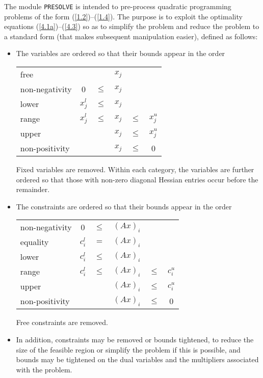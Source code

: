 \documentclass[acmtocl,acmnow]{acmtrans2m}
\newcommand{\req}[1]{(\ref{#1})}
\begin{document}
The module {\tt PRESOLVE} is intended to pre-process
quadratic programming problems of the form \req{1.2}--\req{1.4}.
The purpose is to exploit the
optimality equations \req{4.1a}--\req{4.3} so as to simplify the problem
and reduce the problem to a standard form (that makes subsequent
manipulation easier), defined as follows:
\begin{itemize}
\item The variables are ordered so that their bounds appear in the order
\begin{center}
\begin{tabular}{lccccc}
free                &          &        & $x_j$ &        &          \\
non-negativity      &   0      & $\leq$ & $x_j$ &        &          \\
lower               & $x^l_j$ & $\leq$ & $x_j$ &        &          \\
range               & $x^l_j$ & $\leq$ & $x_j$ & $\leq$ & $x^u_j$ \\
upper               &          &        & $x_j$ & $\leq$ & $x^u_j$ \\
non-positivity      &          &        & $x_j$ & $\leq$ &      0   \\
\end{tabular}
\end{center}

Fixed variables are removed. Within each category, the variables
are further ordered so that those with non-zero diagonal Hessian
entries occur before the remainder.

\item
The constraints are ordered so that their bounds appear in the order
\begin{center}
\begin{tabular}{lccccc}
non-negativity      &     0    & $\leq$ & $( A x)_i$ &        &          \\
equality            & $c^l_i$ &   $=$  & $(A x)_i$ &        &          \\
lower               & $c^l_i$ & $\leq$ & $(A x)_i$ &        &          \\
range               & $c^l_i$ & $\leq$ & $(A x)_i$ & $\leq$ & $c^u_i$ \\
upper               &          &        & $(A x)_i$ & $\leq$ & $c^u_i$ \\
non-positivity      &          &        & $(A x)_i$ & $\leq$ &     0    \\
\end{tabular}
\end{center}
Free constraints are removed.

\item
In addition, constraints may be removed or bounds tightened, to reduce the
size of the feasible region or simplify the problem if this is possible, and
bounds may be tightened on the dual variables and the multipliers
associated  with the problem.
\end{itemize}
\end{document}
